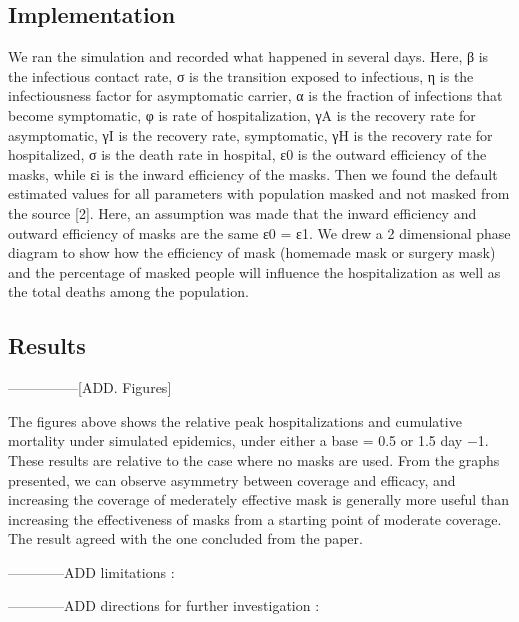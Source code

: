 \documentclass{article}
\begin{document}
\subsection{Implementation}

We ran the simulation and recorded what happened in several days. Here, β is the infectious contact rate, σ is the transition exposed to infectious, η is the infectiousness factor for asymptomatic carrier, α is the fraction of infections that become symptomatic, φ is rate of hospitalization, γA is the recovery rate for asymptomatic, γI is the recovery rate, symptomatic, γH is the recovery rate for hospitalized, σ is the death rate in hospital, ε0 is the outward efficiency of the masks, while εi is the inward efficiency of the masks.
Then we found the default estimated values for all parameters with population masked and not masked from the source [2]. Here, an assumption was made that the inward efficiency and outward efficiency of masks are the same ε0 = ε1. We drew a 2 dimensional phase diagram to show how the efficiency of mask (homemade mask or surgery mask) and the percentage of masked people will influence the hospitalization as well as the total deaths among the population.


\subsection{Results}
---------------[ADD. Figures]

The figures above shows the relative peak hospitalizations and cumulative mortality under simulated epidemics, under either a base  = 0.5 or 1.5 day −1. These results are relative to the case where no masks are used. From the graphs presented, we can observe asymmetry between coverage and efficacy, and increasing the coverage of mederately effective mask is generally more useful than increasing the effectiveness of masks from a starting point of moderate coverage. The result agreed with the one concluded from the paper.

------------ADD limitations :



------------ADD directions for further investigation :
\end{document}
